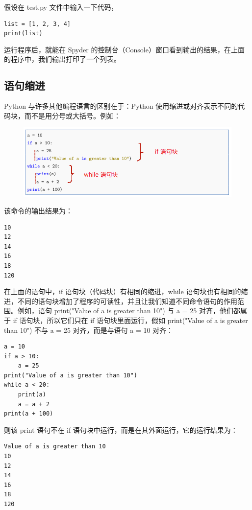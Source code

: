 假设在 test.py 文件中输入一下代码，

\begin{lstlisting}[Language=Python]
list = [1, 2, 3, 4]
print(list)
\end{lstlisting}

运行程序后，就能在 Spyder 的控制台（Console）窗口看到输出的结果，在上面的程序中，我们输出打印了一个列表。

\subsection{语句缩进}

Python 与许多其他编程语言的区别在于：Python 使用缩进或对齐表示不同的代码块，而不是用分号或大括号。例如：

\begin{figure}[!ht]
  \centering
  \includegraphics[scale = 0.9]{figure/codeStyle.png}
\end{figure}

该命令的输出结果为：

\begin{lstlisting}[Language=Python]
10
12
14
16
18
120
\end{lstlisting}

在上面的语句中，if 语句块（代码块）有相同的缩进，while 语句块也有相同的缩进，不同的语句块增加了程序的可读性，并且让我们知道不同命令语句的作用范围。例如，语句 print("Value of a is greater than 10") 与 a = 25 对齐，他们都属于 if 语句块，所以它们只在 if 语句块里面运行，假如 print("Value of a is greater than 10") 不与 a = 25 对齐，而是与语句 a = 10 对齐：

\begin{lstlisting}[Language=Python]
a = 10
if a > 10:
    a = 25
print("Value of a is greater than 10")
while a < 20:
    print(a)
    a = a + 2
print(a + 100)
\end{lstlisting}

则该 print 语句不在 if 语句块中运行，而是在其外面运行，它的运行结果为：

\begin{lstlisting}[Language=Python]
Value of a is greater than 10
10
12
14
16
18
120
\end{lstlisting}

